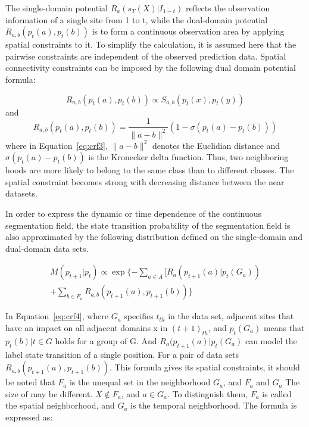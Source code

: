 \documentclass[journal,transmag]{IEEEtran}
\begin{document}
The single-domain potential $R_a (s_T (X)|I_{1-t})$ reflects the observation information of a single site from 1 to t, while the dual-domain potential $R_{a,b}(p_t(a),p_t(b))$ is to form a continuous observation area by applying spatial constraints to it. To simplify the calculation, it is assumed here that the pairwise constraints are independent of the observed prediction data. Spatial connectivity constraints can be imposed by the following dual domain potential formula:

\begin{equation}\label{eq:crf2}
    R_{a,b}(p_t(a),p_t(b)) \propto S_{a,b}(p_t(x),p_t(y)) 
\end{equation}
and 
\begin{equation} \label{eq:crf3}
    R_{a,b}(p_t(a),p_t(b)) = \frac{1}{\parallel a-b \parallel^2} (1-\sigma(p_t(a)-p_t(b)))
\end{equation}
where in Equation~\ref{eq:crf3}, $\parallel a-b \parallel^2$ denotes the Euclidian distance and $\sigma(p_t(a)-p_t(b))$ is the Kronecker delta function\cite{koo2013isogeometric}. Thus, two neighboring hoods are more likely to belong to the same class than to different classes. The spatial constraint becomes strong with decreasing distance between the near datasets.

In order to express the dynamic or time dependence of the continuous segmentation field, the state transition probability of the segmentation field is also approximated by the following distribution defined on the single-domain and dual-domain data sets.

\begin{equation} \label{eq:crf4}
\begin{aligned}
    M(p_{t+1}|p_t) \propto \exp \{ - \sum_{a\in A}[R_a ( p_{t+1} (a)|p_t(G_a)) \\
    +\sum_{b \in F_a} R_{a,b}(p_{t+1}(a),p_{t+1}(b)) \}
    \end{aligned}
\end{equation}

In Equation~\ref{eq:crf4}, where $ G_a $ specifies $t_{th}$ in the data set, adjacent sites that have an impact on all adjacent domains x in $(t+1)_{th}$, and  $p_t(G_a)$ means that $p_t(b)|t \in G$ holds for a group of G. And $R_a (p_{t+1} (a)|p_t(G_a)$ can model the label state transition of a single position. For a pair of data sets $R_{a,b}(p_{t+1}(a),p_{t+1}(b))$. This formula gives its spatial constraints, it should be noted that $ F_a $ is the unequal set in the neighborhood $ G_a $, and $ F_a $ and $ G_a $ The size of may be different. $ X \notin F_a $, and $ a \in G_a $. To distinguish them, $ F_a $ is called the spatial neighborhood, and $ G_a $ is the temporal neighborhood. The formula is expressed as:
\end{document}
